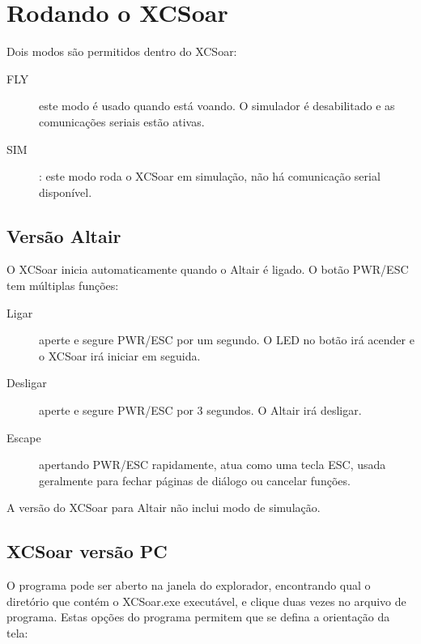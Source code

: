 \section{Rodando o XCSoar}

Dois modos são permitidos dentro do XCSoar: 
\begin{description}
\item[FLY]este modo é usado quando está voando.  O simulador é desabilitado e as comunicações seriais estão ativas.
\item[SIM] :  este modo roda o XCSoar em simulação, não há comunicação serial disponível.
\end{description}

\subsection*{Versão Altair}
O XCSoar inicia automaticamente quando o Altair é ligado.  O botão PWR/ESC tem múltiplas funções:
\begin{description}
\item[Ligar]  aperte e segure PWR/ESC por um segundo.  O LED no botão irá acender e o XCSoar irá iniciar em seguida.
\item[Desligar] aperte e segure PWR/ESC por 3 segundos.  O Altair irá desligar.
\item[Escape] apertando PWR/ESC rapidamente, atua como uma tecla ESC, usada geralmente para fechar páginas de diálogo ou cancelar funções.

\end{description}

A versão do XCSoar para Altair não inclui modo de simulação.

\subsection*{XCSoar versão PC}

O programa pode ser aberto na janela do explorador, encontrando qual o diretório que contém o XCSoar.exe executável, e clique duas vezes no arquivo de programa.
Estas opções do programa permitem que se defina a orientação da tela:

